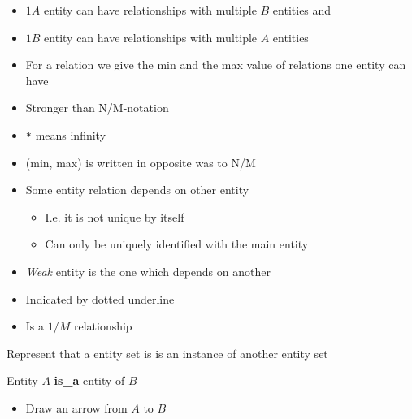 \begin{itemize}
\begin{itemize}
\begin{description}
\begin{itemize}
                            \begin{itemize}
                                \item $1 A$ entity can have relationships with multiple $B$ entities and
                                \item $1 B$ entity can have relationships with multiple $A$ entities
                            \end{itemize}
                    \end{itemize}
            \end{description}
                \begin{itemize}
                    \item For a relation we give the min and the max value of relations one entity can have
                    \item Stronger than N/M-notation
                    \item \verb+*+ means infinity
                    \item (min, max) is written in opposite was to N/M
                \end{itemize}
        \end{itemize}
        \begin{itemize}
            \item Some entity relation depends on other entity
                \begin{itemize}
                    \item I.e. it is not unique by itself
                    \item Can only be uniquely identified with the main entity
                \end{itemize}
            \item \textit{Weak} entity is the one which depends on another
            \item Indicated by dotted underline
            \item Is a $1/M$ relationship
        \end{itemize}
        \begin{description}
            \item Represent that a entity set is is an instance of another entity set
            \item Entity $A$ \textbf{is\_a} entity of $B$
                \begin{itemize}
                    \item Draw an arrow from $A$ to $B$

\end{itemize}
\end{description}
\end{itemize}
